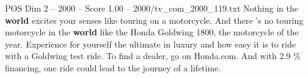 \begin{textsample}{POS Dim 2 – 2000 – Score 1.00 – 2000/tv\_com\_2000\_119.txt}  \label{ex:f2_pos_089}
Nothing in the \textbf{world} excites your senses like touring on a motorcycle.
And there 's no touring motorcycle in the \textbf{world} like the Honda Goldwing 1800, the motorcycle of the year.
Experience for yourself the ultimate in luxury and how easy it is to ride with a Goldwing test ride.
To find a dealer, go on Honda.com.
And with 2.9 \% financing, one ride could lead to the journey of a lifetime.

\end{textsample}

